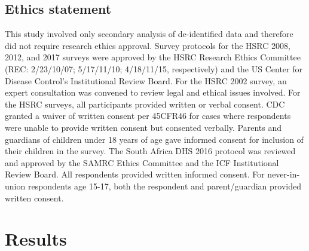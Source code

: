 \documentclass{article}
\begin{document}

\subsection*{Ethics statement}


This study involved only secondary analysis of de-identified data and therefore did not require research ethics approval. Survey protocols for the HSRC 2008, 2012, and 2017 surveys were approved by the HSRC Research Ethics Committee (REC: 2/23/10/07; 5/17/11/10; 4/18/11/15, respectively) and the US Center for Disease Control’s Institutional Review Board. For the HSRC 2002 survey, an expert consultation was convened to review legal and ethical issues involved.  For the HSRC surveys, all participants provided written or verbal consent. CDC granted a waiver of written consent per 45CFR46 for cases where respondents were unable to provide written consent but consented verbally. Parents and guardians of children under 18 years of age gave informed consent for inclusion of their children in the survey. The South Africa DHS 2016 protocol was reviewed and approved by the SAMRC Ethics Committee and the ICF Institutional Review Board. All respondents provided written informed consent. For never-in-union respondents age 15-17, both the respondent and parent/guardian provided written consent.


\section*{Results}


\end{document}
